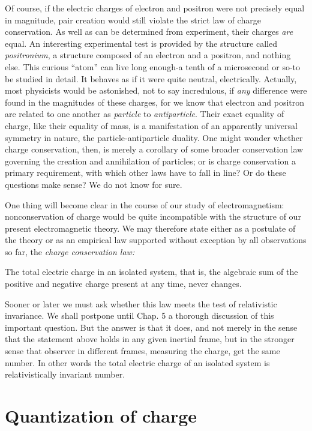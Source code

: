 Of course, if the electric charges of electron and positron
were not precisely equal in magnitude, pair creation would still violate the
strict law of charge conservation. As well as can be determined from
experiment, their charges \emph{are} equal. An interesting experimental test is
provided by the structure called \emph{positronium}, a structure composed of an
electron and a positron, and nothing else. This curious ``atom'' can live long
enough-a tenth of a microsecond or so-to be studied in detail. It behaves as if
it were quite neutral, electrically. Actually, most physicists would be
astonished, not to say incredulous, if \emph{any} difference were found in the
magnitudes of these charges, for we know that electron and positron are related
to one another as \emph{particle} to \emph{antiparticle}. Their exact equality
of charge, like their equality of mass, is a manifestation of an apparently
universal symmetry in nature, the particle-antiparticle duality. One might
wonder whether charge conservation, then, is merely a corollary of some broader
conservation law governing the creation and annihilation of particles; or is
charge conservation a primary requirement, with which other laws have to fall
in line? Or do these questions make sense? We do not know for sure. 

One thing will become clear in the course of our study of
electromagnetism: nonconservation of charge would be quite incompatible with
the structure of our present electromagnetic theory. We may therefore state
either as a postulate of the theory or as an empirical law supported without
exception by all observations so far, the \emph{charge conservation law:}

The total electric charge in an isolated system, that is, the
algebraic sum of the positive and negative charge present at any time, never
changes. 

Sooner or later we must ask whether this law meets the test
of relativistic invariance. We shall postpone until Chap. 5 a thorough
discussion of this important question. But the answer is that it does, and not
merely in the sense that the statement above holds in any given inertial frame,
but in the stronger sense that observer in different frames, measuring the
charge, get the same number. In other words the total electric charge of an
isolated system is relativistically invariant number. 

\section{Quantization of charge} 


